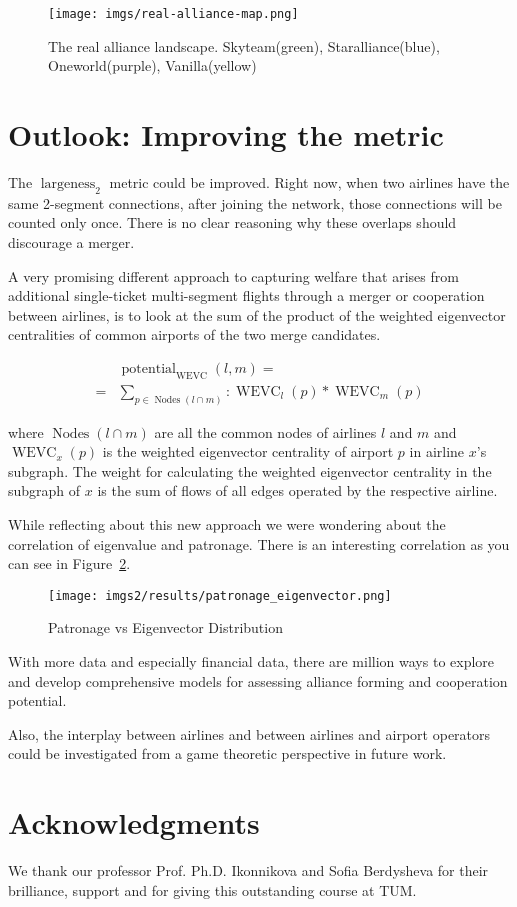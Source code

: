 \documentclass[twocolumn]{tum-article}
\DeclareMathOperator{\Largeness}{largeness}
\DeclareMathOperator{\Potential}{potential}
\DeclareMathOperator{\WEVC}{WEVC}
\DeclareMathOperator{\Nodes}{Nodes}
\begin{document}
\begin{figure}
	\centering
	\texttt{[image: imgs/real-alliance-map.png]}
	\caption{
The real alliance landscape. Skyteam(green), Staralliance(blue), Oneworld(purple), Vanilla(yellow)}
	\label{fig:real-alliance-map}
\end{figure}

\section{Outlook: Improving the metric}
The $\Largeness_{2}$ metric could be improved. Right now, when two airlines have the same 2-segment connections, after joining the network, those connections will be counted only once. There is no clear reasoning why these overlaps should discourage a merger. 

A very promising different approach to capturing welfare that arises from additional single-ticket multi-segment flights through a merger or cooperation between airlines, is to look at the sum of the product of the weighted eigenvector centralities of common airports of the two merge candidates. 

\begin{equation}
\begin{aligned}
& \Potential_{\WEVC}(l, m) = \\
 = & \sum_{p \in \Nodes(l \cap m)}: \WEVC_{l}(p) * \WEVC_{m}(p)
\end{aligned}
\end{equation}

where $\Nodes(l \cap m)$ are all the common nodes of airlines $l$ and $m$ and $\WEVC_{x}(p)$ is the weighted eigenvector centrality of airport $p$ in airline $x$'s subgraph. 
The weight for calculating the weighted eigenvector centrality in the subgraph of $x$ is the sum of flows of all edges operated by the respective airline. 

While reflecting about this new approach we were wondering about the correlation of eigenvalue and patronage. There is an interesting correlation as you can see in Figure~\ref{fig:patronage_eigenvector}.

\begin{figure}
	\centering
	\texttt{[image: imgs2/results/patronage\_eigenvector.png]}
	\caption{
	Patronage vs Eigenvector Distribution}
\label{fig:patronage_eigenvector}
\end{figure}


With more data and especially financial data, there are million ways to explore and develop comprehensive models for assessing alliance forming and cooperation potential. 

Also, the interplay between airlines and between airlines and airport operators could be investigated from a game theoretic perspective in future work. 

\section*{Acknowledgments}
We thank our professor Prof. Ph.D. Ikonnikova and Sofia Berdysheva for their brilliance, support and for giving this outstanding course at TUM.



\end{document}
